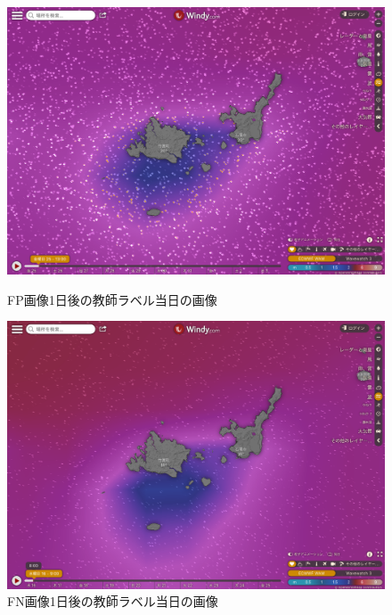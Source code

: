 \begin{figure}[H]
 \begin{minipage}{0.5\hsize}
  \begin{center}
   \includegraphics[keepaspectratio, scale=0.16]{fig/chapter4/wave_hateruma_1/FP_1.png}
  \end{center}
  \caption{FP画像1日後の教師ラベル当日の画像}
  \label{hateruma_1_FP_1}
 \end{minipage}
 \begin{minipage}{0.5\hsize}
  \begin{center}
  \includegraphics[keepaspectratio, scale=0.16]{fig/chapter4/wave_hateruma_1/FN_1.png}
  \end{center}
   \caption{FN画像1日後の教師ラベル当日の画像}
  \label{hateruma_1_FN_1}
 \end{minipage}
\end{figure}

